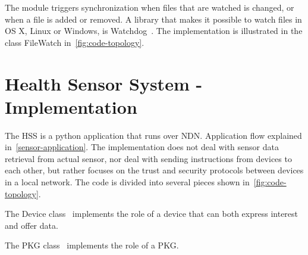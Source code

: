 


The module triggers synchronization when files that are watched is changed, or when a file is added or removed.
A library that makes it possible to watch files in OS X, Linux or Windows, is Watchdog~\cite{watchdog}. 
The implementation is illustrated in the class FileWatch in~\autoref{fig:code-topology}.

\section{Health Sensor System - Implementation}
The \gls{HSS} is a python application that runs over \gls{NDN}.
Application flow explained in~\autoref{sensor-application}.
The implementation does not deal with sensor \gls{data} retrieval from actual sensor, nor deal with sending instructions from devices to each other, but rather focuses on the trust and security protocols between devices in a local network.
The code is divided into several pieces shown in~\autoref{fig:code-topology}.

The Device class~\cite[device.py]{garseg15} implements the role of a device that can both express \gls{interest} and offer \gls{data}.

The PKG class~\cite[publicKeyGenerator.py]{garseg15} implements the role of a \gls{PKG}.

